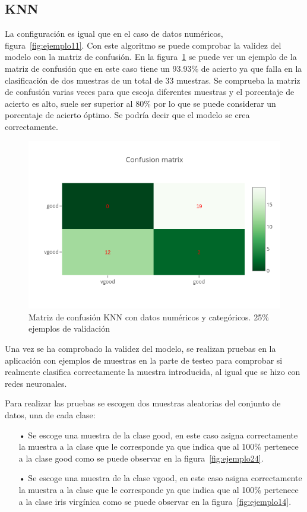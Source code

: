\documentclass[a4paper, 12pt]{book}
\begin{document}
\subsection{KNN}
\label{subsec:knn}

La configuración es igual que en el caso de datos numéricos, figura~\ref{fig:ejemplo11}. Con este algoritmo se puede comprobar la validez del modelo con la matriz de confusión. En la figura~\ref{fig:ejemplo23} se puede ver un ejemplo de la matriz de confusión que en este caso tiene un 93.93\% de acierto ya que falla en la clasificación de dos muestras de un total de 33 muestras. Se comprueba la matriz de confusión varias veces para que escoja diferentes muestras y el porcentaje de acierto es alto, suele ser superior al 80\% por lo que se puede considerar un porcentaje de acierto óptimo. Se podría decir que el modelo se crea correctamente.

\begin{figure}
	\centering
	\includegraphics[width=12cm, keepaspectratio]{img/cm_numycat_knn.png}
	\caption{Matriz de confusión KNN con datos numéricos y categóricos. 25\% ejemplos de validación} 	
	\label{fig:ejemplo23}
\end{figure}

Una vez se ha comprobado la validez del modelo, se realizan pruebas en la aplicación con ejemplos de muestras en la parte de testeo para comprobar si realmente clasifica correctamente la muestra introducida, al igual que se hizo con redes neuronales.

Para realizar las pruebas se escogen dos muestras aleatorias del conjunto de datos, una de cada clase:

\begin{itemize}
\item[•] Se escoge una muestra de la clase good, en este caso asigna correctamente la muestra a la clase que le corresponde ya que indica que al 100\% pertenece a la clase good como se puede observar en la figura~\ref{fig:ejemplo24}.
\item[•] Se escoge una muestra de la clase vgood, en este caso asigna correctamente la muestra a la clase que le corresponde ya que indica que al 100\% pertenece a la clase iris virgínica como se puede observar en la figura~\ref{fig:ejemplo14}.
\end{itemize}
\end{document}
